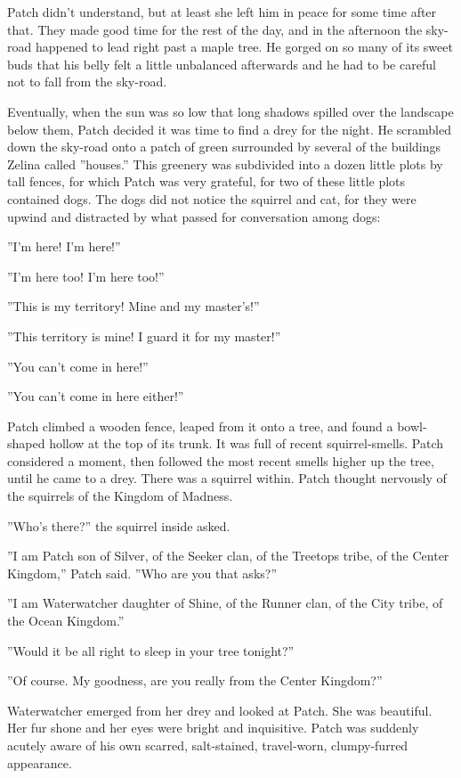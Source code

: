 \documentclass[11pt]{article}
\begin{document}
 Patch didn't understand, but at least she left him in peace for some time after that. They made good time for the rest of the day, and in the afternoon the sky-road happened to lead right past a maple tree. He gorged on so many of its sweet buds that his belly felt a little unbalanced afterwards and he had to be careful not to fall from the sky-road.\par
 Eventually, when the sun was so low that long shadows spilled over the landscape below them, Patch decided it was time to find a drey for the night. He scrambled down the sky-road onto a patch of green surrounded by several of the buildings Zelina called ''houses.'' This greenery was subdivided into a dozen little plots by tall fences, for which Patch was very grateful, for two of these little plots contained dogs. The dogs did not notice the squirrel and cat, for they were upwind and distracted by what passed for conversation among dogs:\par
 ''I'm here! I'm here!''\par
 ''I'm here too! I'm here too!''\par
 ''This is my territory! Mine and my master's!''\par
 ''This territory is mine! I guard it for my master!''\par
 ''You can't come in here!''\par
 ''You can't come in here either!''\par
 Patch climbed a wooden fence, leaped from it onto a tree, and found a bowl-shaped hollow at the top of its trunk. It was full of recent squirrel-smells. Patch considered a moment, then followed the most recent smells higher up the tree, until he came to a drey. There was a squirrel within. Patch thought nervously of the squirrels of the Kingdom of Madness.\par
 ''Who's there?'' the squirrel inside asked.\par
 ''I am Patch son of Silver, of the Seeker clan, of the Treetops tribe, of the Center Kingdom,'' Patch said. ''Who are you that asks?''\par
 ''I am Waterwatcher daughter of Shine, of the Runner clan, of the City tribe, of the Ocean Kingdom.''\par
 ''Would it be all right to sleep in your tree tonight?''\par
 ''Of course. My goodness, are you really from the Center Kingdom?''\par
Waterwatcher emerged from her drey and looked at Patch. She was beautiful. Her fur shone and her eyes were bright and inquisitive. Patch was suddenly acutely aware of his own scarred, salt-stained, travel-worn, clumpy-furred appearance.\par
\end{document}
